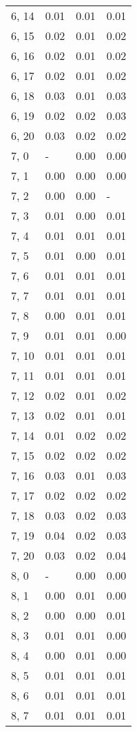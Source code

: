 \begin{table}
\begin{tabular}{llll}
6, 14  &  0.01 &  0.01 &  0.01 \\
6, 15  &  0.02 &  0.01 &  0.02 \\
6, 16  &  0.02 &  0.01 &  0.02 \\
6, 17  &  0.02 &  0.01 &  0.02 \\
6, 18  &  0.03 &  0.01 &  0.03 \\
6, 19  &  0.02 &  0.02 &  0.03 \\
6, 20  &  0.03 &  0.02 &  0.02 \\
7, 0   &     - &  0.00 &  0.00 \\
7, 1   &  0.00 &  0.00 &  0.00 \\
7, 2   &  0.00 &  0.00 &     - \\
7, 3   &  0.01 &  0.00 &  0.01 \\
7, 4   &  0.01 &  0.01 &  0.01 \\
7, 5   &  0.01 &  0.00 &  0.01 \\
7, 6   &  0.01 &  0.01 &  0.01 \\
7, 7   &  0.01 &  0.01 &  0.01 \\
7, 8   &  0.00 &  0.01 &  0.01 \\
7, 9   &  0.01 &  0.01 &  0.00 \\
7, 10  &  0.01 &  0.01 &  0.01 \\
7, 11  &  0.01 &  0.01 &  0.01 \\
7, 12  &  0.02 &  0.01 &  0.02 \\
7, 13  &  0.02 &  0.01 &  0.01 \\
7, 14  &  0.01 &  0.02 &  0.02 \\
7, 15  &  0.02 &  0.02 &  0.02 \\
7, 16  &  0.03 &  0.01 &  0.03 \\
7, 17  &  0.02 &  0.02 &  0.02 \\
7, 18  &  0.03 &  0.02 &  0.03 \\
7, 19  &  0.04 &  0.02 &  0.03 \\
7, 20  &  0.03 &  0.02 &  0.04 \\
8, 0   &     - &  0.00 &  0.00 \\
8, 1   &  0.00 &  0.01 &  0.00 \\
8, 2   &  0.00 &  0.00 &  0.01 \\
8, 3   &  0.01 &  0.01 &  0.00 \\
8, 4   &  0.00 &  0.01 &  0.00 \\
8, 5   &  0.01 &  0.01 &  0.01 \\
8, 6   &  0.01 &  0.01 &  0.01 \\
8, 7   &  0.01 &  0.01 &  0.01 \\

\end{tabular}
\end{table}
